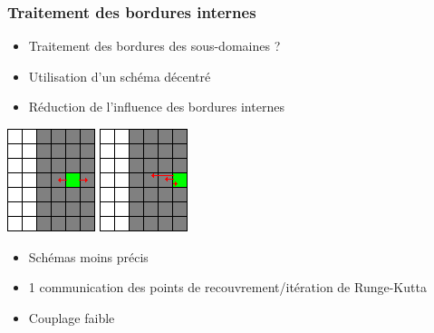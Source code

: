 \documentclass{beamer}
\begin{document}
\begin{frame}
  \frametitle{Traitement des bordures internes}
  \begin{itemize}
  \item   Traitement des bordures des sous-domaines ?
  \item   Utilisation d'un schéma décentré 
  \item   Réduction de l'influence des bordures internes
  \end{itemize}

  \centering
  \includegraphics[scale=0.5]{slide_border_1.png}\hspace{2.5cm}
  \includegraphics[scale=0.5]{slide_border_2.png}
  
\end{frame}


\begin{frame}
  \begin{itemize}
  \item Schémas moins précis
  \item 1 communication des points de recouvrement/itération de Runge-Kutta
  \item Couplage faible
  \end{itemize}
\end{frame}
\end{document}
